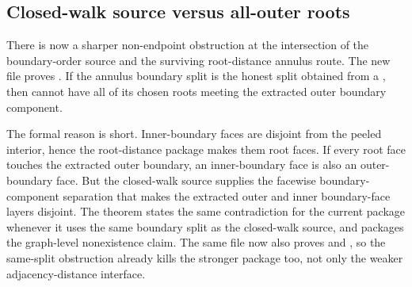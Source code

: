 \documentclass[11pt]{article}
\begin{document}
\subsection{Closed-walk source versus all-outer roots}

There is now a sharper non-endpoint obstruction at the intersection of the
boundary-order source and the surviving root-distance annulus route.  The new
file
proves
.
If the annulus boundary split is the honest split obtained from a
, then
 cannot have all of its
chosen roots meeting the extracted outer boundary component.

The formal reason is short.  Inner-boundary faces are disjoint from the peeled
interior, hence the root-distance package makes them root faces.  If every
root face touches the extracted outer boundary, an inner-boundary face is also
an outer-boundary face.  But the closed-walk source supplies the facewise
boundary-component separation that makes the extracted outer and inner
boundary-face layers disjoint.  The theorem
states the same contradiction for the current
 package whenever it
uses the same boundary split as the closed-walk source, and
packages the graph-level nonexistence claim.  The same file now also proves
and
,
so the same-split obstruction already kills the stronger
 package too, not only the
weaker adjacency-distance interface.
\end{document}
